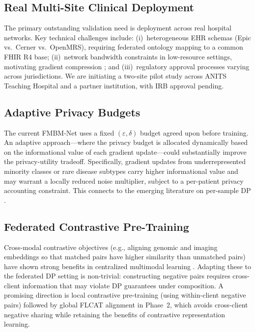 \documentclass[a4paper,fleqn]{cas-dc}
\begin{document}
\subsection{Real Multi-Site Clinical Deployment}

The primary outstanding validation need is deployment across real hospital
networks. Key technical challenges include: (i)~heterogeneous EHR schemas
(Epic vs.\ Cerner vs.\ OpenMRS), requiring federated ontology mapping to
a common FHIR R4 base; (ii)~network bandwidth constraints in low-resource
settings, motivating gradient compression \citep{karimireddy2020scaffold};
and (iii)~regulatory approval processes varying across jurisdictions.
We are initiating a two-site pilot study across ANITS Teaching Hospital and
a partner institution, with IRB approval pending.

\subsection{Adaptive Privacy Budgets}

The current FMBM-Net uses a fixed $(\varepsilon,\delta)$ budget agreed upon
before training. An adaptive approach---where the privacy budget is allocated
dynamically based on the informational value of each gradient update---could
substantially improve the privacy-utility tradeoff. Specifically, gradient
updates from underrepresented minority classes or rare disease subtypes
carry higher informational value and may warrant a locally reduced noise
multiplier, subject to a per-patient privacy accounting constraint. This
connects to the emerging literature on per-sample DP \citep{gopi2021prv}.

\subsection{Federated Contrastive Pre-Training}

Cross-modal contrastive objectives (e.g., aligning genomic and imaging
embeddings so that matched pairs have higher similarity than unmatched pairs)
have shown strong benefits in centralized multimodal learning \citep{huang2021multimodal}.
Adapting these to the federated DP setting is non-trivial: constructing
negative pairs requires cross-client information that may violate DP guarantees
under composition. A promising direction is local contrastive pre-training
(using within-client negative pairs) followed by global FLCAT alignment in
Phase~2, which avoids cross-client negative sharing while retaining the
benefits of contrastive representation learning.
\end{document}
